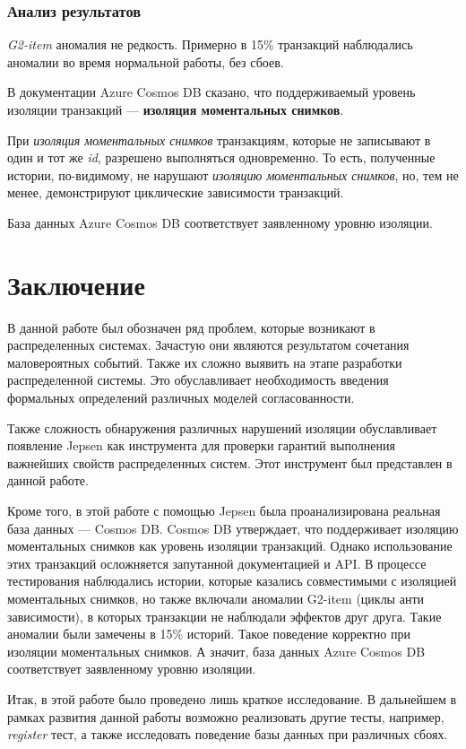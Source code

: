 \documentclass[12pt,  openany]{book}
\begin{document}
\subsection{Анализ результатов}
 \textit{G2-item} аномалия не редкость. Примерно в 15\% транзакций наблюдались аномалии во время нормальной работы, без сбоев.
\par В документации Azure Cosmos DB сказано, что поддерживаемый уровень изоляции транзакций --- \textbf{изоляция моментальных снимков}. 
\par При \textit{изоляция моментальных снимков} транзакциям, которые не записывают в один и тот же \textit{id},  разрешено выполняться одновременно.  То есть, полученные  истории, по-видимому, не нарушают \textit{изоляцию моментальных снимков}, но, тем не менее, демонстрируют циклические зависимости транзакций.
\par База данных Azure Cosmos DB соответствует заявленному уровню изоляции.

\chapter{Заключение}
В данной работе был обозначен ряд проблем, которые возникают в распределенных системах. Зачастую они являются результатом сочетания маловероятных событий. Также их сложно выявить на этапе разработки распределенной системы.  Это обуславливает необходимость введения формальных определений различных моделей согласованности.
\par Также сложность обнаружения различных нарушений изоляции обуславливает появление Jepsen как инструмента для проверки гарантий выполнения важнейших свойств распределенных систем. Этот инструмент был представлен в данной работе.
\par Кроме того, в этой работе с помощью Jepsen была проанализирована реальная база данных --- Cosmos DB.  Cosmos DB утверждает, что поддерживает изоляцию моментальных снимков как уровень изоляции транзакций. Однако использование этих транзакций осложняется запутанной документацией и API.  В процессе тестирования наблюдались истории, которые казались совместимыми с изоляцией моментальных снимков, но также включали аномалии G2-item (циклы анти зависимости), в которых транзакции не наблюдали эффектов друг друга.  Такие аномалии были замечены в 15\% историй.  Такое поведение корректно при изоляции моментальных снимков.  А значит,  база данных Azure Cosmos DB соответствует заявленному уровню изоляции.
\par Итак, в этой работе было проведено лишь краткое исследование. В дальнейшем в рамках развития данной работы возможно реализовать другие тесты, например, \textit{register} тест, а также исследовать поведение базы данных при различных сбоях.




\end{document}
